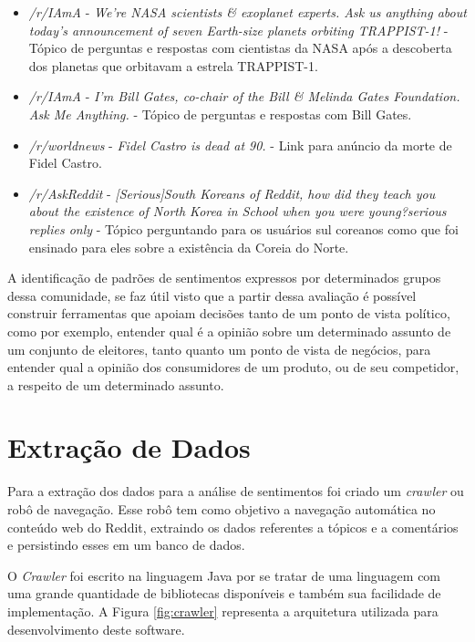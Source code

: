 \begin{itemize}
  \item \textit{/r/IAmA} - \textit{We're NASA scientists \& exoplanet experts.
  Ask us anything about today's announcement of seven Earth-size planets
  orbiting TRAPPIST-1!} - Tópico de perguntas e respostas com cientistas da
  NASA após a descoberta dos planetas que orbitavam a estrela TRAPPIST-1.
  \item \textit{/r/IAmA} - \textit{I’m Bill Gates, co-chair of the Bill \&
  Melinda Gates Foundation. Ask Me Anything.} - Tópico de perguntas e respostas com Bill Gates.
  \item \textit{/r/worldnews} - \textit{Fidel Castro is dead at 90.} - Link para
  anúncio da morte de Fidel Castro.
  \item \textit{/r/AskReddit} - \textit{[Serious]South Koreans of Reddit, how
  did they teach you about the existence of North Korea in School when you were
  young?serious replies only} - Tópico perguntando para os usuários sul coreanos
  como que foi ensinado para eles sobre a existência da Coreia do Norte.
\end{itemize}

A identificação de padrões de sentimentos expressos por determinados grupos
dessa comunidade, se faz útil visto que a partir dessa avaliação é possível construir
ferramentas que apoiam decisões tanto de um ponto de vista político, como por
exemplo, entender qual é a opinião sobre um determinado assunto de um conjunto
de eleitores, tanto quanto um ponto de vista de negócios, para entender qual a
opinião dos consumidores de um produto, ou de seu competidor, a respeito de um
determinado assunto.

\section{Extração de Dados}
\label{cap:Extracao}

Para a extração dos dados para a análise de sentimentos foi criado um
\textit{crawler} ou robô de navegação. Esse robô tem como objetivo a navegação
automática no conteúdo web do Reddit, extraindo os dados referentes a tópicos e
a comentários e persistindo esses em um banco de dados.

O \textit{Crawler} foi escrito na linguagem Java por se tratar de uma linguagem
com uma grande quantidade de bibliotecas disponíveis e também
sua facilidade de implementação. A Figura \ref{fig:crawler} representa a
arquitetura utilizada para desenvolvimento deste software.

